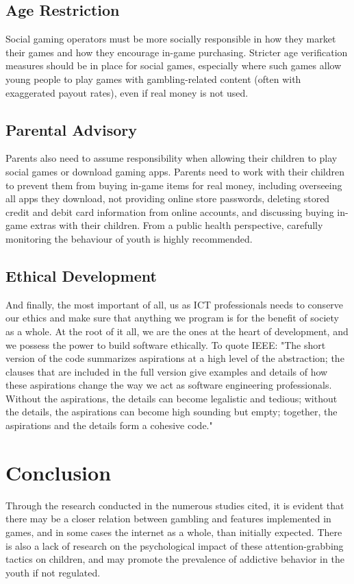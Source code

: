 \documentclass{article}
\begin{document}
\subsection{Age Restriction}
Social gaming operators must be more socially responsible in how they market their
games and how they encourage in-game purchasing. Stricter age
verification measures should be in place for social games, especially where such
games allow young people to play games with gambling-related content (often with
exaggerated payout rates), even if real money is not used.
\subsection{Parental Advisory}
Parents also need to assume responsibility when allowing their children to play
social games or download gaming apps. Parents need to work with their children to prevent them from buying
in-game items for real money, including overseeing all apps they download, not
providing online store passwords, deleting stored credit and debit card information
from online accounts, and discussing buying in-game extras with their children. From a public health perspective, carefully monitoring the
behaviour of youth is highly recommended.
\subsection{Ethical Development}
And finally, the most important of all, us as ICT professionals needs to conserve our ethics and make sure that anything we program is for the benefit of society as a whole.
At the root of it all, we are the ones at the heart of development, and we possess the power to build software ethically. To quote IEEE: "The short version of the code summarizes aspirations at a high level of the abstraction; the clauses that are included in the full version give examples and details of how these aspirations change the way we act as software engineering professionals. Without the aspirations, the details can become legalistic and tedious; without the details, the aspirations can become high sounding but empty; together, the aspirations and the details form a cohesive code." \cite{ieee}


\section{Conclusion}
Through the research conducted in the numerous studies cited, it is evident that there may be a closer relation between gambling and features implemented in games, and in some cases the internet as a whole, than initially expected. There is also a lack of research on the psychological impact of these attention-grabbing tactics on children, and may promote the prevalence of addictive behavior in the youth if not regulated. 

\tableofcontents



\end{document}
